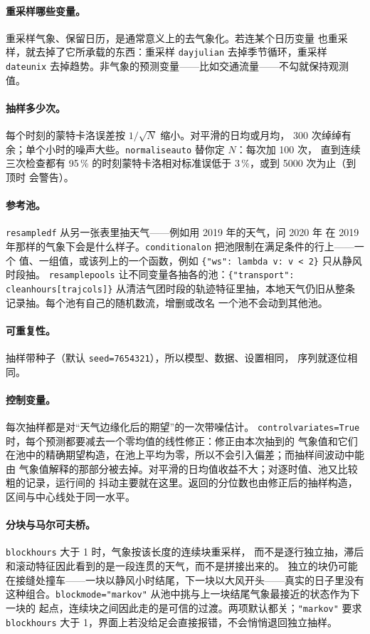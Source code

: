 \documentclass[11pt]{ctexrep}
\newcommand{\codeunderscore}{\textunderscore\allowbreak}
\newcommand{\code}[1]{\texttt{\let\_\codeunderscore #1}}
\begin{document}
\paragraph{重采样哪些变量。}重采样气象、保留日历，是通常意义上的去气象化。若连某个日历变量
也重采样，就去掉了它所承载的东西：重采样 \code{day\_julian} 去掉季节循环，重采样
\code{date\_unix} 去掉趋势。非气象的预测变量——比如交通流量——不勾就保持观测值。

\paragraph{抽样多少次。}每个时刻的蒙特卡洛误差按 $1/\sqrt{N}$ 缩小。对平滑的日均或月均，
300 次绰绰有余；单个小时的噪声大些。\code{normalise\_auto} 替你定 $N$：每次加 100 次，
直到连续三次检查都有 95\,\% 的时刻蒙特卡洛相对标准误低于 3\,\%，或到 5000 次为止（到顶时
会警告）。

\paragraph{参考池。}\code{resample\_df} 从另一张表里抽天气——例如用 2019 年的天气，问 2020 年
在 2019 年那样的气象下会是什么样子。\code{conditional\_on} 把池限制在满足条件的行上——一个
值、一组值，或该列上的一个函数，例如 \code{\{"ws": lambda v: v < 2\}} 只从静风时段抽。
\code{resample\_pools} 让不同变量各抽各的池：\code{\{"transport": clean\_hours[traj\_cols]\}}
从清洁气团时段的轨迹特征里抽，本地天气仍旧从整条记录抽。每个池有自己的随机数流，增删或改名
一个池不会动到其他池。

\paragraph{可重复性。}抽样带种子（默认 \code{seed=7654321}），所以模型、数据、设置相同，
序列就逐位相同。

\paragraph{控制变量。}每次抽样都是对“天气边缘化后的期望”的一次带噪估计。
\code{control\_variates=True} 时，每个预测都要减去一个零均值的线性修正：修正由本次抽到的
气象值和它们在池中的精确期望构造，在池上平均为零，所以不会引入偏差；而抽样间波动中能由
气象值解释的那部分被去掉。对平滑的日均值收益不大；对逐时值、池又比较粗的记录，运行间的
抖动主要就在这里。返回的分位数也由修正后的抽样构造，区间与中心线处于同一水平。

\paragraph{分块与马尔可夫桥。}\code{block\_hours} 大于 1 时，气象按该长度的连续块重采样，
而不是逐行独立抽，滞后和滚动特征因此看到的是一段连贯的天气，而不是拼接出来的。
独立的块仍可能在接缝处撞车——一块以静风小时结尾，下一块以大风开头——真实的日子里没有
这种组合。\code{block\_mode="markov"} 从池中挑与上一块结尾气象最接近的状态作为下一块的
起点，连续块之间因此走的是可信的过渡。两项默认都关；\code{"markov"} 要求
\code{block\_hours} 大于 1，界面上若没给足会直接报错，不会悄悄退回独立抽样。
\end{document}
